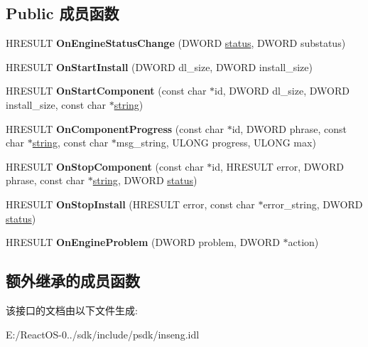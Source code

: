 \subsection*{Public 成员函数}
\begin{DoxyCompactItemize}
\item 
\mbox{\label{interface_i_install_engine_callback_a38857ce654753f0073ff44dc1cb34a28}} 
H\+R\+E\+S\+U\+LT {\bfseries On\+Engine\+Status\+Change} (D\+W\+O\+RD \hyperlink{structstatus}{status}, D\+W\+O\+RD substatus)
\item 
\mbox{\label{interface_i_install_engine_callback_a86e4cfdf0ded39dc0c73564932b9c644}} 
H\+R\+E\+S\+U\+LT {\bfseries On\+Start\+Install} (D\+W\+O\+RD dl\+\_\+size, D\+W\+O\+RD install\+\_\+size)
\item 
\mbox{\label{interface_i_install_engine_callback_a13c2c71d843ed215f4150bdc2703bf7f}} 
H\+R\+E\+S\+U\+LT {\bfseries On\+Start\+Component} (const char $\ast$id, D\+W\+O\+RD dl\+\_\+size, D\+W\+O\+RD install\+\_\+size, const char $\ast$\hyperlink{structstring}{string})
\item 
\mbox{\label{interface_i_install_engine_callback_a534b49715e179f466fcc2754f04ead82}} 
H\+R\+E\+S\+U\+LT {\bfseries On\+Component\+Progress} (const char $\ast$id, D\+W\+O\+RD phrase, const char $\ast$\hyperlink{structstring}{string}, const char $\ast$msg\+\_\+string, U\+L\+O\+NG progress, U\+L\+O\+NG max)
\item 
\mbox{\label{interface_i_install_engine_callback_a876786b3ef9bb23e810ff1d6c81be2f6}} 
H\+R\+E\+S\+U\+LT {\bfseries On\+Stop\+Component} (const char $\ast$id, H\+R\+E\+S\+U\+LT error, D\+W\+O\+RD phrase, const char $\ast$\hyperlink{structstring}{string}, D\+W\+O\+RD \hyperlink{structstatus}{status})
\item 
\mbox{\label{interface_i_install_engine_callback_aa6634e1b44de00d2e68e261ff2274f4e}} 
H\+R\+E\+S\+U\+LT {\bfseries On\+Stop\+Install} (H\+R\+E\+S\+U\+LT error, const char $\ast$error\+\_\+string, D\+W\+O\+RD \hyperlink{structstatus}{status})
\item 
\mbox{\label{interface_i_install_engine_callback_ade5b459d7ae40088eafc9afa5ed8a315}} 
H\+R\+E\+S\+U\+LT {\bfseries On\+Engine\+Problem} (D\+W\+O\+RD problem, D\+W\+O\+RD $\ast$action)
\end{DoxyCompactItemize}
\subsection*{额外继承的成员函数}


该接口的文档由以下文件生成\+:\begin{DoxyCompactItemize}
\item 
E\+:/\+React\+O\+S-\/0../sdk/include/psdk/inseng.\+idl\end{DoxyCompactItemize}
